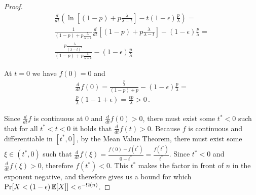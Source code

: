 \begin{proof}
  \begin{align*}
    \frac{d}{dt} \left( \ln\left[(1 - p) + p\frac{\lambda}{\lambda - t}\right] - t(1 - \epsilon)\frac{p}{\lambda} \right) = \\
    \frac{1}{(1 - p) + p\frac{\lambda}{\lambda - t}} \frac{d}{dt} \left[(1 - p) + p\frac{\lambda}{\lambda - t}\right] - (1 - \epsilon)\frac{p}{\lambda} = \\
    \frac{p\frac{\lambda}{(\lambda - t)^2}}{(1 - p) + p\frac{\lambda}{\lambda - t}} - (1 - \epsilon)\frac{p}{\lambda}
  \end{align*}

  At $t = 0$ we have $f(0) = 0$ and
  \begin{align*}
    \frac{d}{dt} f(0) = \frac{\frac{p}{\lambda}}{(1 - p) + p} - (1 - \epsilon)\frac{p}{\lambda} =\\
    \frac{p}{\lambda}(1 - 1 + \epsilon) = \frac{\epsilon p}{\lambda} > 0\,.
  \end{align*}

  Since $\frac{d}{dt} f$ is continuous at $0$ and $\frac{d}{dt} f(0)>  0$, there must exist some $t^* < 0$ such that for all
  $t^* < t < 0$ it holds that $\frac{d}{dt} f(t) > 0$. Because $f$ is continuous and differentiable in $[t^*, 0]$,
  by the Mean Value Theorem, there must exist some $\xi \in (t^*, 0)$ such that
  $\frac{d}{dt} f(\xi) = \frac{f(0) - f(t^*)}{0 - t^*} = \frac{f(t^*)}{t^*}$.
  Since $t^* < 0$ and $\frac{d}{dt} f(\xi) > 0$, therefore $f(t^*) < 0$.
  This $t^*$ makes the factor in front of $n$ in the exponent negative, and therefore
  gives us a bound for which $\Pr[X < (1 - \epsilon)\mathop{{}\mathbb{E}}[X]] < e^{-\Omega(n)}$.
  \Qed
\end{proof}

